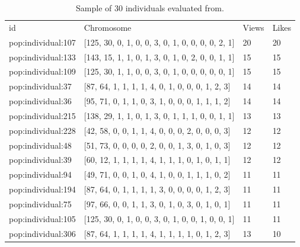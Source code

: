 \begin{table}
\small
\caption{Sample of 30 individuals evaluated from.}
\label{tab:totalIndividuals_1}
\centering
\small
\begin{tabular}{p{3cm} p{4cm} p{3cm} p{3cm}}
\hline\noalign{\smallskip}
 id & Chromosome & Views & Likes  \\
\noalign{\smallskip}\hline\noalign{\smallskip}
\small{pop:individual:107} & \small{[125, 30, 0, 1, 0, 0, 3, 0, 1, 0, 0, 0, 0, 2, 1]}
& \small{20} & \small{20}\\ \hline
\small{pop:individual:133} & \small{[143, 15, 1, 1, 0, 1, 3, 0, 1, 0, 2, 0, 0, 1, 1]}
& \small{15} & \small{15}\\ \hline
\small{pop:individual:109} & \small{[125, 30, 1, 1, 0, 0, 3, 0, 1, 0, 0, 0, 0, 0, 1]}
& \small{15} & \small{15}\\ \hline
\small{pop:individual:37} & \small{[87, 64, 1, 1, 1, 1, 4, 0, 1, 0, 0, 0, 1, 2, 3]}
& \small{14} & \small{14}\\ \hline
\small{pop:individual:36} & \small{[95, 71, 0, 1, 1, 0, 3, 1, 0, 0, 0, 1, 1, 1, 2]}
& \small{14} & \small{14}\\ \hline
\small{pop:individual:215} & \small{[138, 29, 1, 1, 0, 1, 3, 0, 1, 1, 1, 0, 0, 1, 1]}
& \small{13} & \small{13}\\ \hline
\small{pop:individual:228} & \small{[42, 58, 0, 0, 1, 1, 4, 0, 0, 0, 2, 0, 0, 0, 3]}
& \small{12} & \small{12}\\ \hline
\small{pop:individual:48} & \small{[51, 73, 0, 0, 0, 0, 2, 0, 0, 1, 3, 0, 1, 0, 3]}
& \small{12} & \small{12}\\ \hline
\small{pop:individual:39} & \small{[60, 12, 1, 1, 1, 1, 4, 1, 1, 1, 0, 1, 0, 1, 1]}
& \small{12} & \small{12}\\ \hline
\small{pop:individual:94} & \small{[49, 71, 0, 0, 1, 0, 4, 1, 0, 0, 1, 1, 1, 0, 2]}
& \small{11} & \small{11}\\ \hline
\small{pop:individual:194} & \small{[87, 64, 0, 1, 1, 1, 1, 3, 0, 0, 0, 0, 1, 2, 3]}
& \small{11} & \small{11}\\ \hline
\small{pop:individual:75} & \small{[97, 66, 0, 0, 1, 1, 3, 0, 1, 0, 3, 0, 1, 0, 1]}
& \small{11} & \small{11}\\ \hline
\small{pop:individual:105} & \small{[125, 30, 0, 1, 0, 0, 3, 0, 1, 0, 0, 1, 0, 0, 1]}
& \small{11} & \small{11}\\ \hline
\small{pop:individual:306} & \small{[87, 64, 1, 1, 1, 1, 4, 1, 1, 1, 1, 0, 1, 2, 3]}
& \small{13} & \small{10}\\ \hline

\end{tabular}
\end{table}
